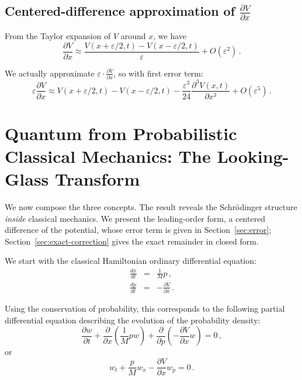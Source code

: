 \documentclass[12pt]{article}
\begin{document}
\subsection{Centered-difference approximation of $\frac{\partial V}{\partial x}$}

From the Taylor expansion of $V$ around $x$, we have
\begin{equation}\label{eq:approximation-derivative}
\frac{\partial V}{\partial x} \approx \frac{V(x+\varepsilon/2,t) - V(x-\varepsilon/2,t)}{\varepsilon}
+ O(\varepsilon^2)  \,.
\end{equation}

We actually approximate $\varepsilon \cdot \frac{\partial V}{\partial x}$, so with first error term:
\begin{equation}\label{eq:approximation-derivative-error}
\varepsilon \frac{\partial V}{\partial x} \approx V(x+\varepsilon/2,t) - V(x-\varepsilon/2,t)
- \frac{\varepsilon^3}{24} \frac{\partial^3 V(x,t)}{\partial x^3} + O(\varepsilon^5)  \,.
\end{equation}

\section{Quantum from Probabilistic Classical Mechanics: The Looking-Glass Transform}
We now compose the three concepts.  The result reveals the Schr\"odinger structure \textit{inside} classical mechanics.  We present the leading-order form, a centered difference of the potential, whose error term is given in Section~\ref{sec:error}; Section~\ref{sec:exact-correction} gives the exact remainder in closed form.

We start with the classical Hamiltonian ordinary differential equation:
\begin{eqnarray}
\frac{dx}{dt} &=& \frac{1}{M}p \,, \\
\frac{dp}{dt} &=& -\frac{\partial V}{\partial x} \,.
\end{eqnarray}

Using the conservation of probability, this corresponds to the following partial differential equation describing the evolution of the probability density:
\begin{equation}
\frac{\partial w}{\partial t}
+ \frac{\partial}{\partial x}\left(\frac{1}{M}pw\right)
+ \frac{\partial}{\partial p}\left(-\frac{\partial V}{\partial x}w\right)
= 0 \,,
\end{equation}
or
\begin{equation}
\label{eq:classical-pde}
w_t + \frac{p}{M} w_x - \frac{\partial V}{\partial x} w_p = 0 \,.
\end{equation}
\end{document}
